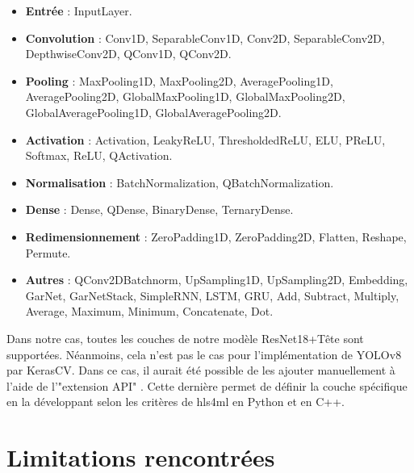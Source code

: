 \begin{itemize}

\item\textbf{Entrée} : InputLayer.\\

\item\textbf{Convolution} : Conv1D, SeparableConv1D, Conv2D, SeparableConv2D, DepthwiseConv2D, QConv1D, QConv2D.\\

\item\textbf{Pooling} : MaxPooling1D, MaxPooling2D, AveragePooling1D, AveragePooling2D, GlobalMaxPooling1D, GlobalMaxPooling2D, GlobalAveragePooling1D, GlobalAveragePooling2D.\\

\item\textbf{Activation} : Activation, LeakyReLU, ThresholdedReLU, ELU, PReLU, Softmax, ReLU, QActivation.\\

\item\textbf{Normalisation} : BatchNormalization, QBatchNormalization.\\

\item\textbf{Dense} : Dense, QDense, BinaryDense, TernaryDense.\\

\item\textbf{Redimensionnement} : ZeroPadding1D, ZeroPadding2D, Flatten, Reshape, Permute.\\

\item\textbf{Autres} : QConv2DBatchnorm, UpSampling1D, UpSampling2D, Embedding, GarNet, GarNetStack, SimpleRNN, LSTM, GRU, Add, Subtract, Multiply, Average, Maximum, Minimum, Concatenate, Dot.\\

\end{itemize}

Dans notre cas, toutes les couches de notre modèle ResNet18+Tête sont supportées. Néanmoins, cela n'est pas le cas pour l'implémentation de YOLOv8 par KerasCV. Dans ce cas, il aurait été possible de les ajouter manuellement à l'aide de l'"extension API" \cite{noauthor_extension_nodate}. Cette dernière permet de définir la couche spécifique en la développant selon les critères de \acrshort{hls4ml} en Python et en C++.

\section{Limitations rencontrées}
\label{sec:hls4ml_limitations}

